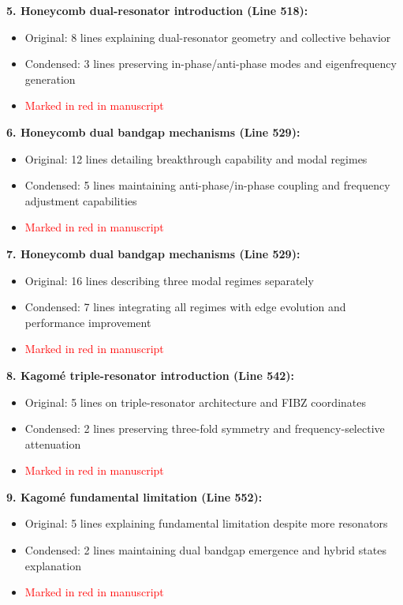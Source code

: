 \documentclass[11pt,a4paper]{article}
\newenvironment{changesbox}{%
    \par\medskip\noindent{\color{changescolor}\rule{\linewidth}{2pt}}\par
    \noindent{\color{changescolor}\bfseries Manuscript Changes}\par\smallskip
}{%
    \par\noindent{\color{changescolor}\rule{\linewidth}{0.5pt}}\medskip
}
\begin{document}
\begin{changesbox}
\textbf{5. Honeycomb dual-resonator introduction (Line 518):}
\begin{itemize}
    \item Original: 8 lines explaining dual-resonator geometry and collective behavior
    \item Condensed: 3 lines preserving in-phase/anti-phase modes and eigenfrequency generation
    \item \textcolor{red}{Marked in red in manuscript}
\end{itemize}

\textbf{6. Honeycomb dual bandgap mechanisms (Line 529):}
\begin{itemize}
    \item Original: 12 lines detailing breakthrough capability and modal regimes
    \item Condensed: 5 lines maintaining anti-phase/in-phase coupling and frequency adjustment capabilities
    \item \textcolor{red}{Marked in red in manuscript}
\end{itemize}

\textbf{7. Honeycomb dual bandgap mechanisms (Line 529):}
\begin{itemize}
    \item Original: 16 lines describing three modal regimes separately
    \item Condensed: 7 lines integrating all regimes with edge evolution and performance improvement
    \item \textcolor{red}{Marked in red in manuscript}
\end{itemize}

\textbf{8. Kagom\'{e} triple-resonator introduction (Line 542):}
\begin{itemize}
    \item Original: 5 lines on triple-resonator architecture and FIBZ coordinates
    \item Condensed: 2 lines preserving three-fold symmetry and frequency-selective attenuation
    \item \textcolor{red}{Marked in red in manuscript}
\end{itemize}

\textbf{9. Kagom\'{e} fundamental limitation (Line 552):}
\begin{itemize}
    \item Original: 5 lines explaining fundamental limitation despite more resonators
    \item Condensed: 2 lines maintaining dual bandgap emergence and hybrid states explanation
    \item \textcolor{red}{Marked in red in manuscript}
\end{itemize}


\end{changesbox}
\end{document}
